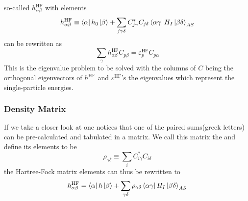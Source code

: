         so-called  $h^{\text{HF}}_{\alpha\beta}$
        with elements
            \begin{equation}
                h^{\text{HF}}_{\alpha\beta} \equiv \bra{\alpha}h_0\ket{\beta} +
                \sum_{j\gamma\delta} C^{*}_{j\gamma}C_{j\delta}
                \bra{\alpha\gamma}H_I\ket{\beta\delta}_{AS}
                \label{eq:HFmatrix}
            \end{equation}
         can be rewritten as
            \begin{equation}
                \sum_{\gamma} h^{\text{HF}}_{\alpha\beta}C_{p\beta} =
                \varepsilon^{\text{HF}}_pC_{p\alpha}
                \label{eq:HFeqFin}
            \end{equation}
        This is the eigenvalue problem to be solved with the columns of $C$
        being the orthogonal eigenvectors of $h^{\text{HF}}$ and
        $\varepsilon^{\text{HF}}$'s the eigenvalues which represent the
        single-particle energies.

    \subsubsection{Density Matrix}
        If we take a closer look at  one notices that one of
        the paired sums(greek letters) can be pre-calculated and tabulated in a
        matrix. We call this matrix the  and define its
        elements to be
            \begin{equation}
                \rho_{\gamma\delta} \equiv \sum_i C^{*}_{i\gamma}C_{i\delta}
                \label{eq:densityMatrix}
            \end{equation}
        the Hartree-Fock matrix elements can thus be rewritten to
            \begin{equation}
                h^{\text{HF}}_{\alpha\beta} = \bra{\alpha}h\ket{\beta}
                + \sum_{\gamma\delta} \rho_{\gamma\delta}
                \bra{\alpha\gamma}H_I\ket{\beta\delta}_{AS}
                \label{eq:rhoHFmatrix}
            \end{equation}

